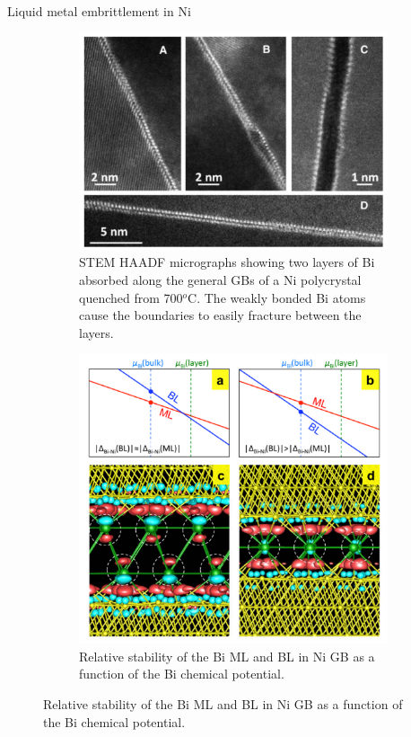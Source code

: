 \documentclass[aspectratio=169]{beamer}
\begin{document}
    \begin{frame}{Liquid metal embrittlement in Ni}
        \begin{figure}
            \centering
            \begin{subfigure}{0.45\textwidth}
                \centering
                \includegraphics[width=\linewidth]{lectures/figures/11_Bi_in_Ni.png}
                \caption{STEM HAADF micrographs showing two layers of Bi absorbed along the general GBs of a Ni polycrystal quenched from 700$^o$C. The weakly bonded Bi atoms cause the boundaries to easily fracture between the layers.\cite{luoRoleBilayerInterfacial2011}}
            \end{subfigure}
            \begin{subfigure}{0.45\textwidth}
                \centering
                \includegraphics[width=0.8\linewidth]{lectures/figures/11_Bi_in_Ni_DFT.png}
                \caption{Relative stability of the Bi ML and BL in Ni GB as a function of the Bi chemical potential.\cite{kangOriginBismuthInducedDecohesion2013}}
            \end{subfigure}
        \end{figure}
    \end{frame}
\end{document}
